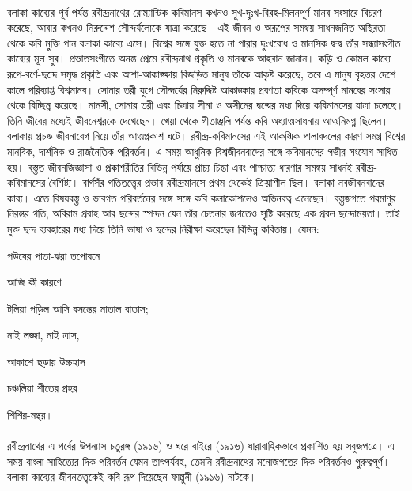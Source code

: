 \documentclass{article}
\begin{document}
\paragraph{}
বলাকা কাব্যের পূর্ব পর্যন্ত রবীন্দ্রনাথের রোম্যান্টিক কবিমানস কখনও সুখ-দুঃখ-বিরহ-মিলনপূর্ণ মানব সংসারে বিচরণ করেছে, আবার কখনও নিরুদ্দেশ সৌন্দর্যলোকে যাত্রা করেছে। এই জীবন ও অরূপের সমন্বয় সাধনজনিত অস্থিরতা থেকে কবি মুক্তি পান বলাকা কাব্যে এসে। বিশ্বের সঙ্গে যুক্ত হতে না পারার দুঃখবোধ ও মানসিক দ্বন্দ্ব তাঁর সন্ধ্যাসংগীত কাব্যের মূল সুর। প্রভাতসংগীতে অনন্ত প্রেমে রবীন্দ্রনাথ প্রকৃতি ও মানবকে আহবান জানান। কড়ি ও কোমল কাব্যে রূপে-বর্ণে-ছন্দে সমৃদ্ধ প্রকৃতি এবং আশা-আকাঙ্ক্ষায় বিজড়িত মানুষ তাঁকে আকৃষ্ট করেছে, তবে এ মানুষ বৃহত্তর দেশে কালে পরিব্যাপ্ত বিশ্বমানব। সোনার তরী যুগে সৌন্দর্যের নিরুদ্দিষ্ট আকাঙ্ক্ষার প্রবণতা কবিকে অসম্পূর্ণ মানবের সংসার থেকে বিচ্ছিন্ন করেছে। মানসী, সোনার তরী এবং চিত্রায় সীমা ও অসীমের দ্বন্দ্বের মধ্য দিয়ে কবিমানসের যাত্রা চলেছে। তিনি জীবের মধ্যেই জীবনেশ্বরকে দেখেছেন। খেয়া থেকে গীতাঞ্জলি পর্যন্ত কবি অধ্যাত্মসাধনায় আত্মনিমগ্ন ছিলেন। বলাকায় প্রচন্ড জীবনাবেগ নিয়ে তাঁর আত্মপ্রকাশ ঘটে। রবীন্দ্র-কবিমানসের এই আকস্মিক পালাবদলের কারণ সমগ্র বিশ্বের মানবিক, দার্শনিক ও রাজনৈতিক পরিবর্তন। এ সময় আধুনিক বিশ্বজীবনবাদের সঙ্গে কবিমানসের গভীর সংযোগ সাধিত হয়। বস্ত্তত জীবনজিজ্ঞাসা ও প্রকাশরীতির বিভিন্ন পর্যায়ে প্রাচ্য চিন্তা এবং পাশ্চাত্য ধারণার সমন্বয় সাধনই রবীন্দ্র-কবিমানসের বৈশিষ্ট্য। বার্গসঁর গতিতত্ত্বের প্রভাব রবীন্দ্রমানসে প্রথম থেকেই ক্রিয়াশীল ছিল। বলাকা নবজীবনবাদের কাব্য। এতে বিষয়বস্ত্ত ও ভাবগত পরিবর্তনের সঙ্গে সঙ্গে কবি কলাকৌশলেও অভিনবত্ব এনেছেন। বস্ত্তজগতে পরমাণুর নিরন্তর গতি, অবিরাম প্রবাহ আর ছন্দের স্পন্দন যেন তাঁর চেতনার জগতেও সৃষ্টি করেছে এক প্রবল ছন্দোময়তা। তাই মুক্ত ছন্দ ব্যবহারের মধ্য দিয়ে তিনি ভাষা ও ছন্দের নিরীক্ষা করেছেন বিভিন্ন কবিতায়। যেমন:

পউষের পাতা-ঝরা তপোবনে

আজি কী কারণে

টলিয়া পড়িল আসি বসন্তের মাতাল বাতাস;

নাই লজ্জা, নাই ত্রাস,

আকাশে ছড়ায় উচ্চহাস

চঞ্চলিয়া শীতের প্রহর

শিশির-মন্থর।
\paragraph{}
রবীন্দ্রনাথের এ পর্বের উপন্যাস চতুরঙ্গ (১৯১৬) ও ঘরে বাইরে  (১৯১৬) ধারাবাহিকভাবে প্রকাশিত হয় সবুজপত্রে। এ সময় বাংলা সাহিত্যের দিক-পরিবর্তন যেমন তাৎপর্যবহ, তেমনি রবীন্দ্রনাথের মনোজগতের দিক-পরিবর্তনও গুরুত্বপূর্ণ। বলাকা কাব্যের জীবনতত্ত্বকেই কবি রূপ দিয়েছেন ফাল্গুনী (১৯১৬) নাটকে।
\end{document}
